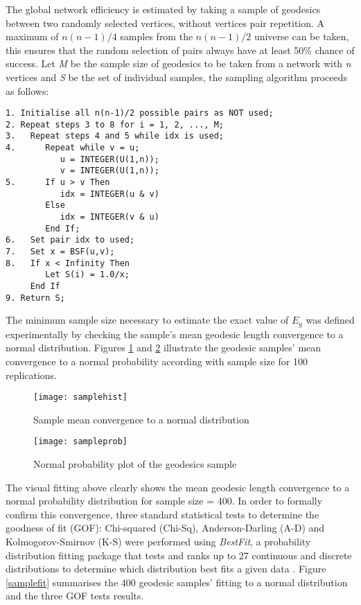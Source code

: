 The global network efficiency is estimated by taking a sample of geodesics between two
randomly selected vertices, without vertices pair repetition. A maximum of $n(n-1)/4$
samples from the $n(n-1)/2$ universe can be taken, this ensures that the random selection
of pairs always have at least 50\% chance of success. Let \emph{M} be the sample size of
geodesics to be taken from a network with \emph{n} vertices and \emph{S} be the set of
individual samples, the sampling algorithm proceeds as follows:

\begin{verbatim}
1. Initialise all n(n-1)/2 possible pairs as NOT used;
2. Repeat steps 3 to 8 for i = 1, 2, ..., M;
3.   Repeat steps 4 and 5 while idx is used;
4.      Repeat while v = u;
           u = INTEGER(U(1,n));
           v = INTEGER(U(1,n));
5.      If u > v Then
           idx = INTEGER(u & v)
        Else
           idx = INTEGER(v & u)
        End If;
6.   Set pair idx to used;
7.   Set x = BSF(u,v);
8.   If x < Infinity Then
        Let S(i) = 1.0/x;
     End If
9. Return S;
\end{verbatim}

The minimum sample size necessary to estimate the exact value of $E_g$ was defined
experimentally by checking the sample's mean geodesic length convergence to a normal
distribution. Figures \ref{samplehist} and \ref{sampleprob} illustrate the geodesic
samples' mean convergence to a normal probability according with sample size for 100
replications.

\begin{figure}[ht]
\begin{center}
\texttt{[image: samplehist]}
\caption{Sample mean convergence to a normal distribution} \label{samplehist}
\end{center}
\end{figure}
\begin{figure}[ht]
\begin{center}
\texttt{[image: sampleprob]}
\caption{Normal probability plot of the geodesics sample} \label{sampleprob}
\end{center}
\end{figure}

\clearpage

The visual fitting above clearly shows the mean geodesic length convergence to a normal
probability distribution for sample size = 400. In order to formally confirm this
convergence, three standard statistical tests to determine the goodness of fit (GOF):
Chi-squared (Chi-Sq), Anderson-Darling (A-D) and Kolmogorov-Smirnov (K-S) were performed
using \emph{BestFit}, a probability distribution fitting package that tests and ranks up
to 27 continuous and discrete distributions to determine which distribution best fits a
given data  \cite{bestfit452}. Figure \ref{samplefit} summarises the 400 geodesic
samples' fitting to a normal distribution and the three GOF tests results.

